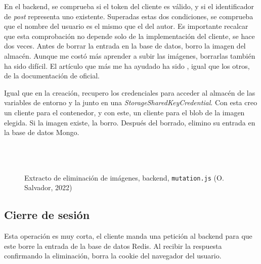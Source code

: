 \documentclass[11pt]{article}
\begin{document}
\begin{flushleft}
	En el backend, se comprueba si el token del cliente es válido, y si el identificador de \textit{post} representa uno existente. Superadas estas dos condiciones, se comprueba que el nombre del usuario es el mismo que el del autor. Es importante recalcar que esta comprobación no depende solo de la implementación del cliente, se hace dos veces. Antes de borrar la entrada en la base de datos, borro la imagen del almacén. Aunque me costó más aprender a subir las imágenes, borrarlas también ha sido difícil. El artículo que más me ha ayudado ha sido \cite{ms_rm_blob}, igual que los otros, de la documentación de oficial.
	\linebreak
	
	Igual que en la creación, recupero los credenciales para acceder al almacén de las variables de entorno y la junto en una \textit{StorageSharedKeyCredential}. Con esta creo un cliente para el contenedor, y con este, un cliente para el blob de la imagen elegida. Si la imagen existe, la borro. Después del borrado, elimino su entrada en la base de datos Mongo.
	\linebreak
	
	\begin{figure}[htb]
        \centering
        \begin{subfigure}{0.9\textwidth}
        \inputminted[fontsize=\scriptsize, firstline=104, lastline=104, linenos, frame=single, breaklines]{javascript}{../../backend/src/resolvers/mutation.js}
        \vspace{-.6cm}
        \inputminted[fontsize=\scriptsize, firstline=107, lastline=110, linenos, frame=single, breaklines]{javascript}{../../backend/src/resolvers/mutation.js}
        \vspace{-.6cm}
        \inputminted[fontsize=\scriptsize, firstline=118, lastline=118, linenos, frame=single, breaklines]{javascript}{../../backend/src/resolvers/mutation.js}
        \vspace{-.6cm}
        \inputminted[fontsize=\scriptsize, firstline=126, lastline=126, linenos, frame=single, breaklines]{javascript}{../../backend/src/resolvers/mutation.js}
        \end{subfigure}
        \caption{Extracto de eliminación de imágenes, backend, \texttt{mutation.js} (O. Salvador, 2022)}
    \end{figure}

	\bigskip
	\bigskip
	
	\subsection{Cierre de sesión}
	Esta operación es muy corta, el cliente manda una petición al backend para que este borre la entrada de la base de datos Redis. Al recibir la respuesta confirmando la eliminación, borra la cookie del navegador del usuario.
	\linebreak














\end{flushleft}
\end{document}
